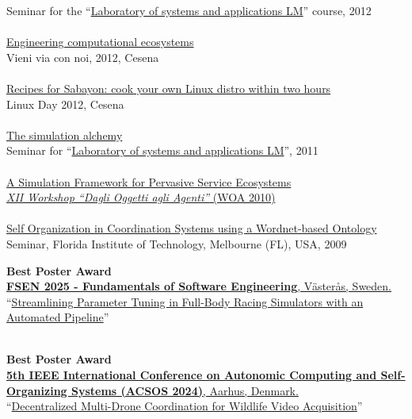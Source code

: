\documentclass[10pt]{article}
\renewcommand{\section}[2]%
        {\pagebreak[3]\vspace{1.3\baselineskip}%
         \phantomsection\addcontentsline{toc}{section}{#1}%
         \hspace{0in}%
         \marginpar{
         \raggedright \scshape #1}#2}
\newcommand{\halfblankline}{\quad\vspace{-0.5\baselineskip}\pagebreak[3]}
\begin{document}
Seminar for the ``\href{http://apice.unibo.it/xwiki/bin/view/Courses/LsaLm1213}{Laboratory of systems and applications LM}'' course, 2012
\\ \halfblankline \\
\href{https://www.slideshare.net/DanySK/engineering-computational-ecosystems}{Engineering computational ecosystems} \\
Vieni via con noi, 2012, Cesena
\\ \halfblankline \\
\href{https://www.slideshare.net/DanySK/recipes-for-sabayon-cook-your-own-linux-distro-within-two-hours}{Recipes for Sabayon: cook your own Linux distro within two hours} \\
Linux Day 2012, Cesena
\\ \halfblankline \\
\href{http://campus.unibo.it/83921/}{The simulation alchemy} \\
Seminar for ``\href{http://apice.unibo.it/xwiki/bin/view/Courses/LsaLm1112}{Laboratory of systems and applications LM}'', 2011
\\ \halfblankline \\
\href{http://apice.unibo.it/xwiki/bin/view/Talks/PianiniWoa2011}{A Simulation Framework for Pervasive Service Ecosystems} \\
\href{http://www.inf.u-szeged.hu/projectdirs/saso10/}{\textit{XII Workshop ``Dagli Oggetti agli Agenti''} (WOA 2010)}
\\ \halfblankline \\
\href{}{Self Organization in Coordination Systems using a Wordnet-based Ontology} \\
Seminar, Florida Institute of Technology, Melbourne (FL), USA, 2009

\section{Awards}
\textbf{Best Poster Award}\\
\href{https://conf.researchr.org/home/fsen-2025}{
  \textbf{FSEN 2025 - Fundamentals of Software Engineering},
    Västerås, Sweden.
}\\
``\href{https://github.com/DanySK/poster-2025-fsen-parameter-tuning-pipeline/raw/master/PosterDelta.pdf}{Streamlining Parameter Tuning in Full-Body Racing Simulators with an Automated Pipeline}''

\halfblankline\\
\textbf{Best Poster Award}\\
\href{https://2024.acsos.org/}{
  \textbf{5th IEEE International Conference on Autonomic Computing and Self-Organizing Systems (ACSOS 2024)},
    Aarhus, Denmark.
}\\
``\href{https://github.com/DanySK/poster-2024-acsos-imageonomics-drones/blob/f426784e6d6daa98f2288d298d059617231b6104/poster-printed.pdf}{Decentralized Multi-Drone Coordination for Wildlife Video Acquisition}''
\end{document}
